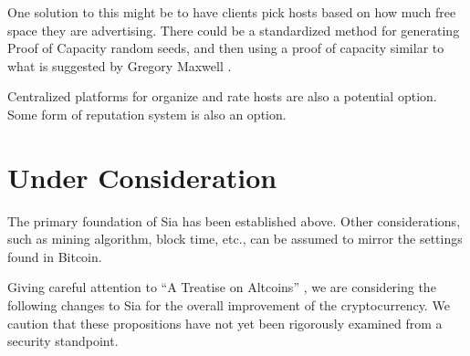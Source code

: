 \documentclass[twocolumn]{article}
\begin{document}
One solution to this might be to have clients pick hosts based on how much free space they are advertising.
There could be a standardized method for generating Proof of Capacity random seeds, and then using a proof of capacity similar to what is suggested by Gregory Maxwell \cite{poc}.

Centralized platforms for organize and rate hosts are also a potential option.
Some form of reputation system is also an option.



\section{Under Consideration}
The primary foundation of Sia has been established above.
Other considerations, such as mining algorithm, block time, etc., can be assumed to mirror the settings found in Bitcoin.

Giving careful attention to ``A Treatise on Altcoins'' \cite{alts}, we are considering the following changes to Sia for the overall improvement of the cryptocurrency.
We caution that these propositions have not yet been rigorously examined from a security standpoint.
\end{document}
